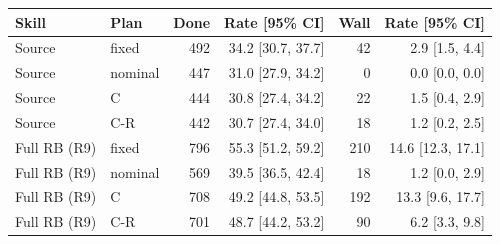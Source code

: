 \begin{tabular}{llrrrr}
\toprule
Skill & Plan & Done & Rate [95\% CI] & Wall & Rate [95\% CI] \\
\midrule
Source & fixed & 492 & 34.2 [30.7, 37.7] & 42 & 2.9 [1.5, 4.4] \\
Source & nominal & 447 & 31.0 [27.9, 34.2] & 0 & 0.0 [0.0, 0.0] \\
Source & C & 444 & 30.8 [27.4, 34.2] & 22 & 1.5 [0.4, 2.9] \\
Source & C-R & 442 & 30.7 [27.4, 34.0] & 18 & 1.2 [0.2, 2.5] \\
Full RB (R9) & fixed & 796 & 55.3 [51.2, 59.2] & 210 & 14.6 [12.3, 17.1] \\
Full RB (R9) & nominal & 569 & 39.5 [36.5, 42.4] & 18 & 1.2 [0.0, 2.9] \\
Full RB (R9) & C & 708 & 49.2 [44.8, 53.5] & 192 & 13.3 [9.6, 17.7] \\
Full RB (R9) & C-R & 701 & 48.7 [44.2, 53.2] & 90 & 6.2 [3.3, 9.8] \\
\bottomrule
\end{tabular}

